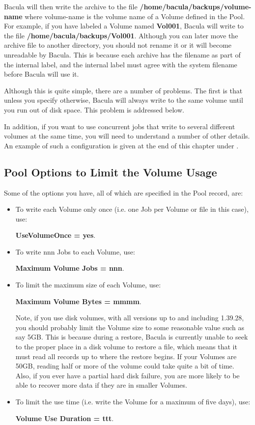 Bacula will then write the archive to the file {\bf
/home/bacula/backups/\lt{}volume-name\gt{}} where \lt{}volume-name\gt{} is the
volume name of a Volume defined in the Pool. For example, if you have labeled
a Volume named {\bf Vol001}, Bacula will write to the file {\bf
/home/bacula/backups/Vol001}. Although you can later move the archive file to
another directory, you should not rename it or it will become unreadable by
Bacula. This is because each archive has the filename as part of the internal
label, and the internal label must agree with the system filename before
Bacula will use it. 

Although this is quite simple, there are a number of problems. The first is
that unless you specify otherwise, Bacula will always write to the same volume
until you run out of disk space. This problem is addressed below.

In addition, if you want to use concurrent jobs that write to several
different volumes at the same time, you will need to understand a number
of other details. An example of such a configuration is given
at the end of this chapter under .

\subsection{Pool Options to Limit the Volume Usage}

Some of the options you have, all of which are specified in the Pool record,
are: 

\begin{itemize}
\item To write each Volume only once (i.e. one Job per Volume or file  in this
   case), use:

{\bf UseVolumeOnce = yes}. 

\item To write nnn Jobs to each Volume, use:

   {\bf Maximum Volume Jobs = nnn}.  

\item To limit the maximum size of each Volume, use:

   {\bf Maximum Volume Bytes = mmmm}.  

   Note, if you use disk volumes, with all versions up to and including
   1.39.28, you should probably limit the Volume size to some reasonable 
   value such as say 5GB. This is because during a restore, Bacula is
   currently unable to seek to the proper place in a disk volume to restore
   a file, which means that it must read all records up to where the
   restore begins. If your Volumes are 50GB, reading half or more of the
   volume could take quite a bit of time.  Also, if you ever have a partial
   hard disk failure, you are more likely to be able to recover more data
   if they are in smaller Volumes.

\item To limit the use time (i.e. write the Volume for a maximum of five days),
   use:

{\bf Volume Use Duration = ttt}. 
\end{itemize}

